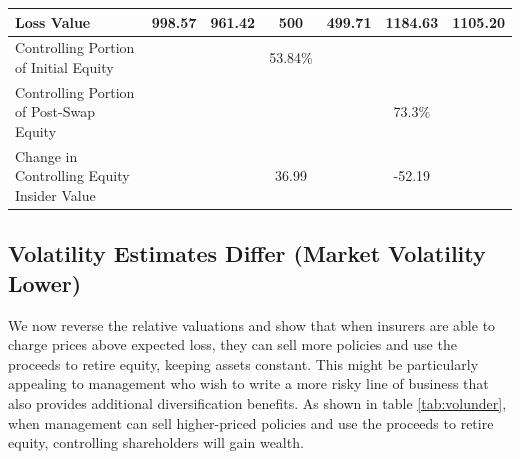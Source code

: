\begin{table}
\begin{center}
\begin{tabular}{p{2in}cccccc}
Loss Value & 998.57 &   961.42 &        500 &   499.71 &   1184.63 &   1105.20 \\ 

\midrule

Controlling Portion of Initial Equity &            &            &   53.84\% &            &            &            \\ 

Controlling Portion of Post-Swap Equity &            &            &            &            &   73.3\% &            \\ 

\midrule
Change in Controlling Equity Insider Value &            &            &   36.99 &            &   -52.19 &            \\ 
\bottomrule

\end{tabular}  

\end{center}
\end{table}

\subsection{Volatility Estimates Differ (Market Volatility Lower)}

We now reverse the relative valuations and show that when insurers are able to charge prices above expected loss, they can sell more policies and use the proceeds to retire equity, keeping assets constant. This might be particularly appealing to management who wish to write a more risky line of business that also provides additional diversification benefits.  As shown in table \ref{tab:volunder}, when management can sell higher-priced policies and use the proceeds to retire equity, controlling shareholders will gain wealth.

